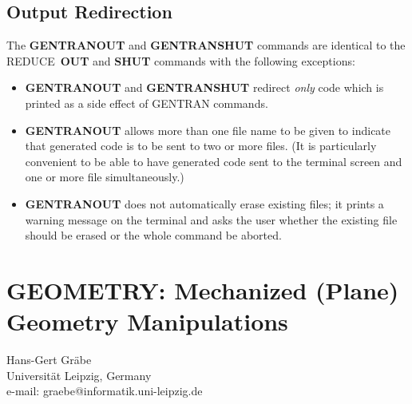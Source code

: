 \documentclass[11pt,letterpaper]{book}
\makeatletter
\newcommand{\REDUCE}{REDUCE}
\newcommand{\underscore}{\_}
\newcommand{\ttindex}[1]{{\renewcommand{\_}{\protect\underscore}%
                          \index{#1@{\tt #1}}}}
\makeatother
\begin{document}
\section{Output Redirection}\label{GENTRAN:output}

The {\bf GENTRANOUT} and {\bf GENTRANSHUT} commands are identical to
the \REDUCE\ {\bf OUT} and {\bf SHUT} commands with the following
exceptions:

\begin{itemize}
\item {\bf GENTRANOUT} and {\bf GENTRANSHUT} redirect {\it only\/}
code which is printed as a side effect of GENTRAN commands.
\item {\bf GENTRANOUT} allows more than one file name to be given
to indicate that generated code is to be sent to two or more
files.  (It is particularly convenient to be able to
have generated code sent to
the terminal screen and one or more file simultaneously.)
\item {\bf GENTRANOUT} does not automatically erase existing files; it
prints a warning message on the terminal and asks the user whether the
existing file should be erased or the whole command be aborted.
\end{itemize}

\chapter[GEOMETRY: Plane geometry]%
{GEOMETRY: Mechanized (Plane) Geometry Manipulations}
\label{GEOMETRY}

\newcommand{\xxyy}[2] {\noindent{\f{#1}} \\\hspace*{1cm}
   \parbox[t]{9cm}{#2} \\[6pt]}
\newcommand{\geo}{{\sc Geometry}}
\newenvironment{code}{\tt \begin{tabbing}
   \hspace*{1cm}\=\hspace*{1cm}\=\hspace*{1cm}\=
   \hspace*{1cm}\=\hspace*{1cm}\=\kill}{\end{tabbing}}

{\footnotesize
\begin{center}
Hans-Gert Gr\"abe \\
Universit\"at Leipzig, Germany \\
e-mail: graebe@informatik.uni-leipzig.de \\
\end{center}
}
\ttindex{GEOMETRY}
\end{document}
